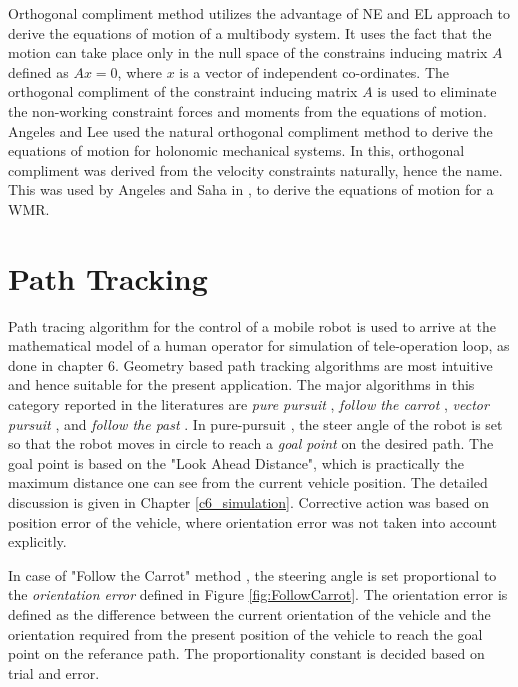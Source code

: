 Orthogonal compliment method utilizes the advantage of NE and EL approach to derive the equations of motion of  a multibody  system.  It uses the fact that the motion can take place only in the null space of the constrains inducing matrix $A$ defined as $Ax=0$, where $x$ is a vector of independent co-ordinates. The orthogonal compliment of the constraint inducing matrix $A$ is used to eliminate the non-working constraint  forces  and moments from the equations of motion.  Angeles and Lee \cite{angeles1988formulation} used the natural orthogonal compliment method to derive the equations of motion for holonomic mechanical systems. In this,  orthogonal compliment was derived from the velocity constraints naturally, hence the name. This was  used by Angeles \cite{angeles2013fundamentals} and Saha in \cite{saha1989kinematics},\cite{saha1991dynamics} to derive the equations of motion for a WMR. 

\section{Path Tracking}
Path tracing algorithm for the control of a mobile robot is used to arrive at the mathematical model of a human operator for simulation of tele-operation loop, as done in chapter 6. Geometry based path tracking algorithms are most intuitive and hence suitable for the present application. The major algorithms in this  category reported in the literatures are \textit{pure pursuit} \cite{coulter1992implementation}, \textit{follow the carrot} \cite{barton2001controller}, \textit{vector pursuit} \cite{wit2004autonomous}, and \textit{follow the past} \cite{hellstrom2006follow}. In pure-pursuit \cite{coulter1992implementation}, the steer angle of the robot is set so that the robot moves in circle to reach a \textit{ goal point} on the desired path. The goal point is based on the "Look Ahead Distance", which is practically the maximum distance one can see from the current vehicle position. The detailed discussion is given in Chapter \ref{c6_simulation}.  Corrective action was based on  position error of the vehicle, where orientation error was not taken into account explicitly. 

In case of "Follow the Carrot" method \cite{barton2001controller},  the steering angle is set proportional to the \textit{orientation error} defined in Figure \ref{fig:FollowCarrot}. The orientation error is defined as the difference between the current orientation of the vehicle and the orientation required from the present position of the vehicle to reach the goal point on the referance path.  The proportionality constant is decided based on trial and error.

